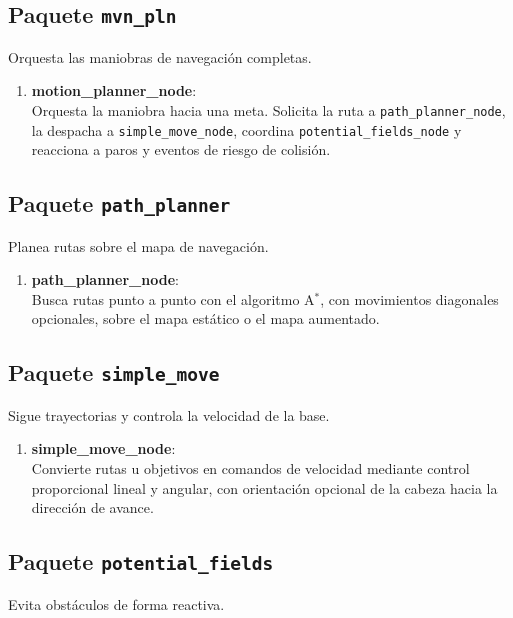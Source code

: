 \subsection{Paquete \texttt{mvn\_pln}}
Orquesta las maniobras de navegación completas.

\begin{enumerate}
    \item \textbf{motion\_planner\_node}: \\
    Orquesta la maniobra hacia una meta. Solicita la ruta a \texttt{path\_planner\_node}, la despacha a \texttt{simple\_move\_node}, coordina \texttt{potential\_fields\_node} y reacciona a paros y eventos de riesgo de colisión.
\end{enumerate}

\subsection{Paquete \texttt{path\_planner}}
Planea rutas sobre el mapa de navegación.

\begin{enumerate}
    \item \textbf{path\_planner\_node}: \\
    Busca rutas punto a punto con el algoritmo A$^{*}$, con movimientos diagonales opcionales, sobre el mapa estático o el mapa aumentado.
\end{enumerate}

\subsection{Paquete \texttt{simple\_move}}
Sigue trayectorias y controla la velocidad de la base.

\begin{enumerate}
    \item \textbf{simple\_move\_node}: \\
    Convierte rutas u objetivos en comandos de velocidad mediante control proporcional lineal y angular, con orientación opcional de la cabeza hacia la dirección de avance.
\end{enumerate}

\subsection{Paquete \texttt{potential\_fields}}
Evita obstáculos de forma reactiva.

